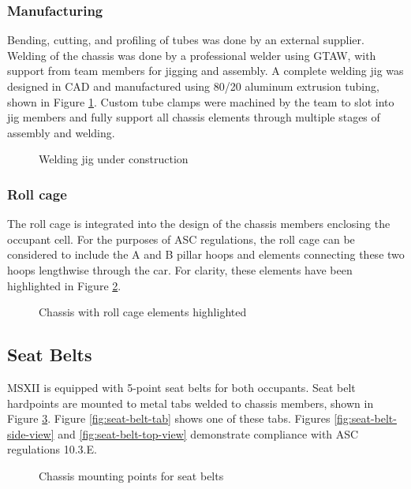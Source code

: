 \documentclass[10pt]{article}
\begin{document}
\subsubsection{Manufacturing}
Bending, cutting, and profiling of tubes was done by an external supplier. Welding of the chassis was done by a professional welder using GTAW, with support from team members for jigging and assembly. A complete welding jig was designed in CAD and manufactured using 80/20 aluminum extrusion tubing, shown in Figure \ref{fig:welding-jig}. Custom tube clamps were machined by the team to slot into jig members and fully support all chassis elements through multiple stages of assembly and welding.

\begin{figure}
\centering
\caption{Welding jig under construction}
\label{fig:welding-jig}
\end{figure}

\subsubsection{Roll cage}
The roll cage is integrated into the design of the chassis members enclosing the occupant cell. For the purposes of ASC regulations, the roll cage can be considered to include the A and B pillar hoops and elements connecting these two hoops lengthwise through the car. For clarity, these elements have been highlighted in Figure \ref{fig:roll-cage}.

\begin{figure}
\centering
\caption{Chassis with roll cage elements highlighted}
\label{fig:roll-cage}
\end{figure}


\subsection{Seat Belts}
MSXII is equipped with 5-point seat belts for both occupants. Seat belt hardpoints are mounted to metal tabs welded to chassis members, shown in Figure \ref{fig:seat-belt-tab-positions}. Figure \ref{fig:seat-belt-tab} shows one of these tabs. Figures \ref{fig:seat-belt-side-view} and \ref{fig:seat-belt-top-view} demonstrate compliance with ASC regulations 10.3.E.

\begin{figure}
\centering
\caption{Chassis mounting points for seat belts}
\label{fig:seat-belt-tab-positions}
\end{figure}
\end{document}
